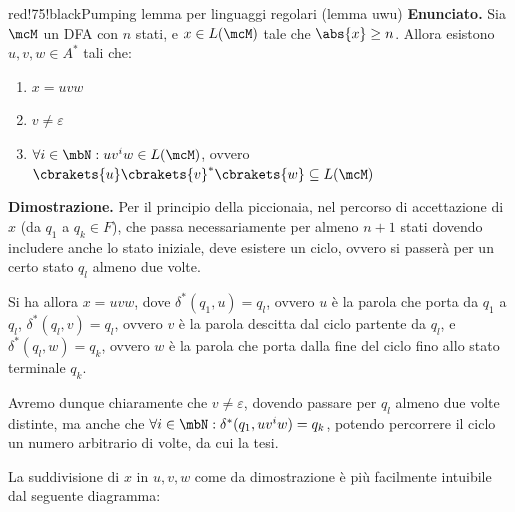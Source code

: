 \begin{halfframedbox}{red!75!black}{Pumping lemma per linguaggi regolari (lemma uwu)}
  \textbf{Enunciato. } Sia \(\mcM\) un DFA con \(n\) stati, e \(x\in L(\mcM)\) tale che \(\abs{x} \geq n\). Allora esistono \(u,v,w \in A^*\) tali che:

  \begin{enumerate}
    \item \(x=uvw\)
    \item \(v \neq \varepsilon\)
    \item \(\forall i \in \mbN: uv^{i}w \in L(\mcM)\), ovvero \( \cbrakets{u}\cbrakets{v}^*\cbrakets{w} \subseteq L(\mcM)\)
  \end{enumerate}

  \begin{center}
    \textcolor{red!75!black}{\hdashrule[0.5ex]{18cm}{1pt}{3mm 3pt 1mm 2pt}}
  \end{center}

  \textbf{Dimostrazione. } Per il principio della piccionaia, nel percorso di accettazione di \(x\) (da \(q_1\) a \(q_k \in F\)), che passa necessariamente per almeno \(n+1\) stati dovendo includere anche lo stato iniziale, deve esistere un ciclo, ovvero si passerà per un certo stato \(q_l\) almeno due volte.

  Si ha allora \(x=uvw\), dove \(\delta^*(q_1,u)=q_l\), ovvero \(u\) è la parola che porta da \(q_1\) a \(q_l\), \(\delta^*(q_l,v)=q_l\), ovvero \(v\) è la parola descitta dal ciclo partente da \(q_l\), e \(\delta^*(q_l,w)=q_k\), ovvero \(w\) è la parola che porta dalla fine del ciclo fino allo stato terminale \(q_k\).

  Avremo dunque chiaramente che \(v \neq \varepsilon\), dovendo passare per \(q_l\) almeno due volte distinte, ma anche che \(\forall i \in \mbN: \delta^*(q_1,uv^{i}w)=q_k\), potendo percorrere il ciclo un numero arbitrario di volte, da cui la tesi.

  La suddivisione di \(x\) in \(u,v,w\) come da dimostrazione è più facilmente intuibile dal seguente diagramma:

  \medskip
  \begin{center}
\end{center}
\end{halfframedbox}
